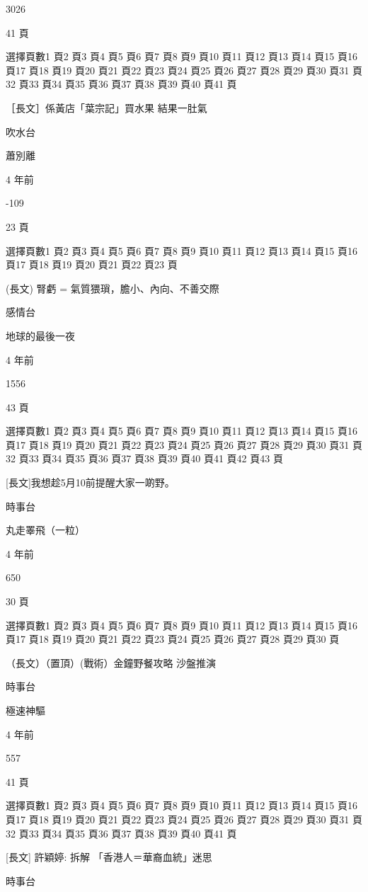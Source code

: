 3026

41 頁

選擇頁數1 頁2 頁3 頁4 頁5 頁6 頁7 頁8 頁9 頁10 頁11 頁12 頁13 頁14 頁15 頁16 頁17 頁18 頁19 頁20 頁21 頁22 頁23 頁24 頁25 頁26 頁27 頁28 頁29 頁30 頁31 頁32 頁33 頁34 頁35 頁36 頁37 頁38 頁39 頁40 頁41 頁

［長文］係黃店「葉宗記」買水果 結果一肚氣

吹水台

蕭別離

4 年前

-109

23 頁

選擇頁數1 頁2 頁3 頁4 頁5 頁6 頁7 頁8 頁9 頁10 頁11 頁12 頁13 頁14 頁15 頁16 頁17 頁18 頁19 頁20 頁21 頁22 頁23 頁

(長文) 腎虧 = 氣質猥瑣，膽小、內向、不善交際

感情台

地球的最後一夜

4 年前

1556

43 頁

選擇頁數1 頁2 頁3 頁4 頁5 頁6 頁7 頁8 頁9 頁10 頁11 頁12 頁13 頁14 頁15 頁16 頁17 頁18 頁19 頁20 頁21 頁22 頁23 頁24 頁25 頁26 頁27 頁28 頁29 頁30 頁31 頁32 頁33 頁34 頁35 頁36 頁37 頁38 頁39 頁40 頁41 頁42 頁43 頁

[長文]我想趁5月10前提醒大家一啲野。

時事台

丸走睪飛（一粒）

4 年前

650

30 頁

選擇頁數1 頁2 頁3 頁4 頁5 頁6 頁7 頁8 頁9 頁10 頁11 頁12 頁13 頁14 頁15 頁16 頁17 頁18 頁19 頁20 頁21 頁22 頁23 頁24 頁25 頁26 頁27 頁28 頁29 頁30 頁

（長文）（置頂）(戰術）金鐘野餐攻略 沙盤推演

時事台

極速神驅

4 年前

557

41 頁

選擇頁數1 頁2 頁3 頁4 頁5 頁6 頁7 頁8 頁9 頁10 頁11 頁12 頁13 頁14 頁15 頁16 頁17 頁18 頁19 頁20 頁21 頁22 頁23 頁24 頁25 頁26 頁27 頁28 頁29 頁30 頁31 頁32 頁33 頁34 頁35 頁36 頁37 頁38 頁39 頁40 頁41 頁

[長文] 許穎婷: 拆解 「香港人＝華裔血統」迷思

時事台

